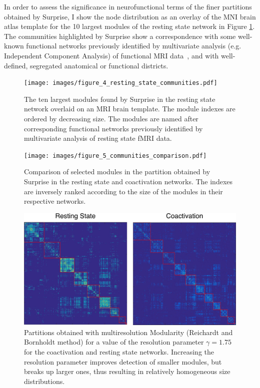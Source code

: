 In order to assess the significance in neurofunctional terms of the finer partitions obtained by Surprise, I show the node distribution as an overlay of the MNI brain atlas template for the 10 largest modules of the resting state network in Figure \ref{fig:figure_4_resting_state_communities}. The communities highlighted by Surprise show a correspondence with some well-known functional networks previously identified by multivariate analysis (e.g. Independent Component Analysis) of functional MRI data~\cite{raichle2001,salvador2005,damoiseaux2006,deluca2006}, and with well-defined, segregated anatomical or functional districts.

\begin{figure}[htb!]
\centering
\texttt{[image: images/figure\_4\_resting\_state\_communities.pdf]}
\caption{The ten largest modules found by Surprise in the resting state network overlaid on an MRI brain template. The module indexes are ordered by decreasing size. The modules are named after corresponding functional networks previously identified by multivariate analysis of resting state fMRI data.}
\label{fig:figure_4_resting_state_communities}
\end{figure}

\begin{figure}[htb!]
\centering
\texttt{[image: images/figure\_5\_communities\_comparison.pdf]}
\caption{Comparison of selected modules in the partition obtained by Surprise in the resting state and coactivation networks. The indexes are inversely ranked according to the size of the modules in their respective networks.}
\label{fig:figure_5_communities_comparison}
\end{figure}

\begin{figure}[htb!]
\centering
\includegraphics[width=1\linewidth]{images/coact_rs_gamma_1_75.png}
\caption{Partitions obtained with multiresolution Modularity (Reichardt and Bornholdt method) for a value of the resolution parameter $\gamma=1.75$ for the coactivation and resting state networks. Increasing the resolution parameter improves detection of smaller modules, but breaks up larger ones, thus resulting in relatively homogeneous size distributions.}
\label{fig:figure_11_gamma_1_75_rs_coact}
\end{figure}

